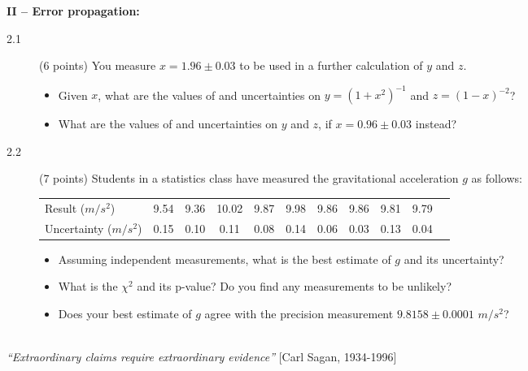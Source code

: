 \documentclass[11pt]{article}
\begin{document}

\vspace{2ex}
\noindent
{\bf II -- Error propagation:}
\begin{description}
\item[2.1] (6 points)
  You measure $x = 1.96 \pm 0.03$ to be used in a further calculation of $y$ and $z$.
  \vspace*{-1ex}
  \begin{itemize} 
    \item Given $x$, what are the values of and uncertainties on $y = (1 + x^2)^{-1}$ and $z = (1 - x)^{-2}$?
    \item What are the values of and uncertainties on $y$ and $z$, if $x = 0.96 \pm 0.03$ instead?
  \end{itemize}
%
\item[2.2] (7 points) 
  Students in a statistics class have measured the gravitational acceleration $g$ as follows:
  \vspace*{-1ex}
  \begin{center}
  \begin{tabular}{l|cccccccccc}
    \hline
    \hline
    Result ($m/s^2$)       &9.54   &9.36   &10.02   &9.87   &9.98   &9.86   &9.86   &9.81   &9.79\\
    Uncertainty ($m/s^2$)  &0.15   &0.10   & 0.11   &0.08   &0.14   &0.06   &0.03   &0.13   &0.04\\
    \hline
    \hline
  \end{tabular}
  \end{center}
  \begin{itemize}
    \item Assuming independent measurements, what is the best estimate of $g$ and its uncertainty?
    \item What is the $\chi^2$ and its p-value? Do you find any measurements to be unlikely?
    \item Does your best estimate of $g$ agree with the precision measurement $9.8158 \pm 0.0001$ $m/s^2$?
  \end{itemize}
\end{description}



\noindent
\hrulefill\\
\emph{``Extraordinary claims require extraordinary evidence''}
  \phantom{} \hfill [Carl Sagan, 1934-1996]\\[-2ex]
\end{document}

